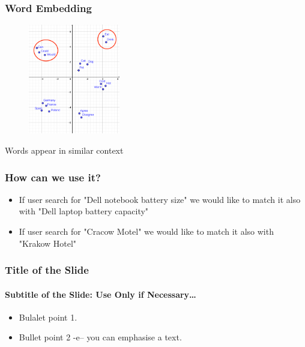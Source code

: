 \begin{frame}
	\frametitle{Word Embedding}

	\begin{figure}
		\includegraphics[width=4cm]{./figures/Group_context}
	\end{figure}
		\begin{center}
		{Words appear in similar context}
		\end{center}
	\vspace{-0.5cm}

\end{frame}


\begin{frame}
	\frametitle{How can we use it?}
	
	\begin{itemize}
		\item If user search for "Dell notebook battery size" we would like to match it also with "Dell laptop battery capacity"
		\item If user search for "Cracow Motel" we would like to match it also with "Krakow Hotel"
	\end{itemize}
	
\end{frame}











\begin{frame}
	\frametitle{Title of the Slide}
		\framesubtitle{Subtitle of the Slide: Use Only if Necessary\dots}
	
	\begin{itemize}
		\item Bulalet point 1.
		\item Bullet point 2 -e-- \alert{you can emphasise} a text.
	\end{itemize}

\end{frame}

